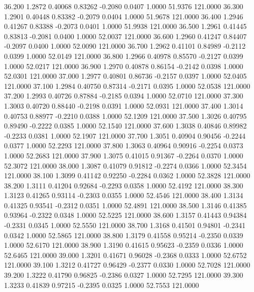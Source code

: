   36.200   1.2872   0.40068   0.83262  -0.2080   0.0407   1.0000  51.9376 121.0000
  36.300   1.2901   0.40448   0.83382  -0.2079   0.0404   1.0000  51.9678 121.0000
  36.400   1.2946   0.41267   0.83388  -0.2073   0.0401   1.0000  51.9938 121.0000
  36.500   1.2961   0.41445   0.83813  -0.2081   0.0400   1.0000  52.0037 121.0000
  36.600   1.2960   0.41247   0.84407  -0.2097   0.0400   1.0000  52.0090 121.0000
  36.700   1.2962   0.41101   0.84989  -0.2112   0.0399   1.0000  52.0149 121.0000
  36.800   1.2966   0.40978   0.85570  -0.2127   0.0399   1.0000  52.0217 121.0000
  36.900   1.2970   0.40878   0.86154  -0.2142   0.0398   1.0000  52.0301 121.0000
  37.000   1.2977   0.40801   0.86736  -0.2157   0.0397   1.0000  52.0405 121.0000
  37.100   1.2984   0.40750   0.87314  -0.2171   0.0395   1.0000  52.0538 121.0000
  37.200   1.2993   0.40726   0.87884  -0.2185   0.0394   1.0000  52.0710 121.0000
  37.300   1.3003   0.40720   0.88440  -0.2198   0.0391   1.0000  52.0931 121.0000
  37.400   1.3014   0.40753   0.88977  -0.2210   0.0388   1.0000  52.1209 121.0000
  37.500   1.3026   0.40795   0.89490  -0.2222   0.0385   1.0000  52.1540 121.0000
  37.600   1.3038   0.40846   0.89982  -0.2233   0.0381   1.0000  52.1907 121.0000
  37.700   1.3051   0.40904   0.90456  -0.2244   0.0377   1.0000  52.2293 121.0000
  37.800   1.3063   0.40964   0.90916  -0.2254   0.0373   1.0000  52.2683 121.0000
  37.900   1.3075   0.41015   0.91367  -0.2264   0.0370   1.0000  52.3072 121.0000
  38.000   1.3087   0.41079   0.91812  -0.2274   0.0366   1.0000  52.3454 121.0000
  38.100   1.3099   0.41142   0.92250  -0.2284   0.0362   1.0000  52.3828 121.0000
  38.200   1.3111   0.41204   0.92684  -0.2293   0.0358   1.0000  52.4192 121.0000
  38.300   1.3123   0.41265   0.93114  -0.2303   0.0355   1.0000  52.4546 121.0000
  38.400   1.3134   0.41325   0.93541  -0.2312   0.0351   1.0000  52.4891 121.0000
  38.500   1.3146   0.41385   0.93964  -0.2322   0.0348   1.0000  52.5225 121.0000
  38.600   1.3157   0.41443   0.94384  -0.2331   0.0345   1.0000  52.5550 121.0000
  38.700   1.3168   0.41501   0.94801  -0.2341   0.0342   1.0000  52.5865 121.0000
  38.800   1.3179   0.41558   0.95214  -0.2350   0.0339   1.0000  52.6170 121.0000
  38.900   1.3190   0.41615   0.95623  -0.2359   0.0336   1.0000  52.6465 121.0000
  39.000   1.3201   0.41671   0.96028  -0.2368   0.0333   1.0000  52.6752 121.0000
  39.100   1.3212   0.41727   0.96429  -0.2377   0.0330   1.0000  52.7028 121.0000
  39.200   1.3222   0.41790   0.96825  -0.2386   0.0327   1.0000  52.7295 121.0000
  39.300   1.3233   0.41839   0.97215  -0.2395   0.0325   1.0000  52.7553 121.0000
